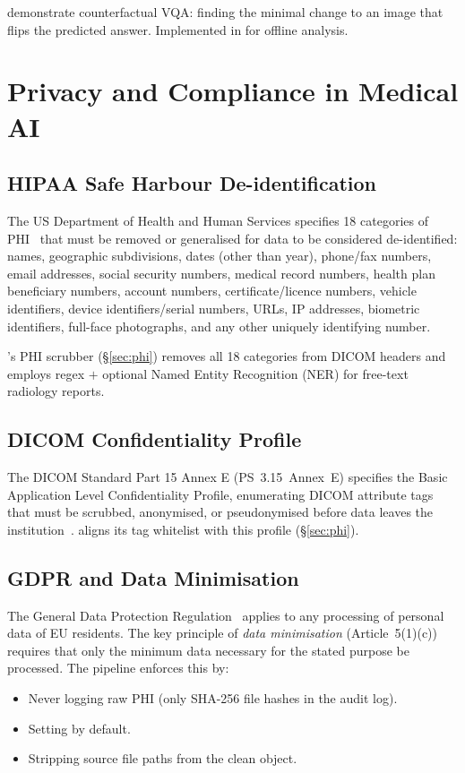 \cite{goyal2019counterfactual} demonstrate counterfactual VQA: finding the
minimal change to an image that flips the predicted answer. Implemented in
 for offline analysis.

\section{Privacy and Compliance in Medical AI}
\label{sec:lit_privacy}

\subsection{HIPAA Safe Harbour De-identification}
\label{subsec:hipaa}

The US Department of Health and Human Services specifies
18 categories of \textsc{PHI}~\citep{hipaa} that must be removed or
generalised for data to be considered de-identified:
names, geographic subdivisions, dates (other than year), phone/fax numbers,
email addresses, social security numbers, medical record numbers,
health plan beneficiary numbers, account numbers, certificate/licence numbers,
vehicle identifiers, device identifiers/serial numbers, URLs, IP addresses,
biometric identifiers, full-face photographs, and any other uniquely
identifying number.

\medxplain{}'s PHI scrubber (\S\ref{sec:phi}) removes all 18 categories
from DICOM headers and employs regex $+$ optional Named Entity Recognition
(NER) for free-text radiology reports.

\subsection{DICOM Confidentiality Profile}
\label{subsec:dicom_profile}

The DICOM Standard Part 15 Annex E (PS~3.15~Annex~E) specifies the
Basic Application Level Confidentiality Profile, enumerating DICOM
attribute tags that must be scrubbed, anonymised, or pseudonymised
before data leaves the institution~\citep{dicom2023}.
\medxplain{} aligns its tag whitelist with this profile (\S\ref{sec:phi}).

\subsection{GDPR and Data Minimisation}
\label{subsec:gdpr}

The General Data Protection Regulation~\citep{gdpr} applies to any
processing of personal data of EU residents. The key principle of
\emph{data minimisation} (Article~5(1)(c)) requires that only the minimum
data necessary for the stated purpose be processed. The \medxplain{}
pipeline enforces this by:
\begin{itemize}
  \item Never logging raw PHI (only SHA-256 file hashes in the audit log).
  \item Setting  by default.
  \item Stripping source file paths from the clean  object.
\end{itemize}


